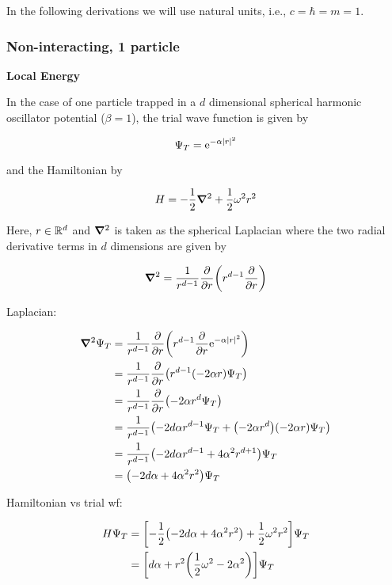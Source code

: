 In the following derivations we will use natural units, i.e., $c = \hbar = m = 1$.

\subsubsection*{Non-interacting, 1 particle}

\textbf{Local Energy}

In the case of one particle trapped in a $d$ dimensional spherical harmonic oscillator potential ($\beta = 1$), the trial wave function is given by 

\begin{equation*}
    \Psi_T = \mathrm{e}^{-\alpha \abs{r}^2}
\end{equation*}

and the Hamiltonian by

\begin{equation*}
    H = - \frac{1}{2} \grad^2 + \frac{1}{2} \omega^2 r^2
\end{equation*}

Here, $r \in \mathbb{R}^d$ and $\grad^2$ is taken as the spherical Laplacian where the two radial derivative terms in $d$ dimensions are given by

\begin{equation*}
    \grad^2 = \frac{1}{r^{d-1}} \pdv{r} \qty(r^{d-1} \pdv{r})
\end{equation*}

Laplacian: 

\begin{align*}
    \grad^2 \Psi_T &= \frac{1}{r^{d-1}} \pdv{r} \qty(r^{d-1} \pdv{r} \mathrm{e}^{-\alpha \abs{r}^2})
    \\
    &= \frac{1}{r^{d-1}} \pdv{r} \qty(r^{d-1} \qty(- 2 \alpha r) \Psi_T)
    \\
    &= \frac{1}{r^{d-1}} \pdv{r} \qty(- 2 \alpha r^d \Psi_T)
    \\
    &= \frac{1}{r^{d-1}} \qty(-2d\alpha r^{d-1} \Psi_T + \qty(- 2 \alpha r^d)\qty(- 2 \alpha r) \Psi_T )
    \\
    &= \frac{1}{r^{d-1}} \qty(-2d \alpha r^{d-1} + 4 \alpha^2 r^{d+1}) \Psi_T
    \\
    &= \qty(-2d \alpha + 4 \alpha^2 r^2) \Psi_T
\end{align*}

Hamiltonian vs trial wf: 

\begin{align*}
    H \Psi_T &= \qty[ - \frac{1}{2} \qty(-2d \alpha + 4 \alpha^2 r^2) + \frac{1}{2} \omega^2 r^2] \Psi_T
    \\
    &= \qty[ d \alpha + r^2 \qty(\frac{1}{2} \omega^2 - 2 \alpha^2) ] \Psi_T
\end{align*}

